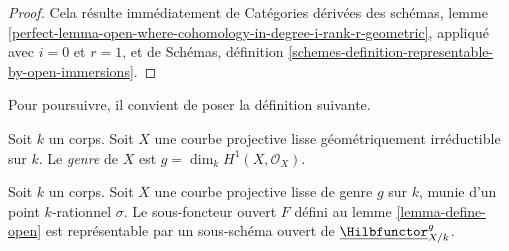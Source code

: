\begin{proof}
Cela résulte immédiatement de Catégories dérivées des schémas, lemme
\ref{perfect-lemma-open-where-cohomology-in-degree-i-rank-r-geometric},
appliqué avec $i = 0$ et $r = 1$, et de
Schémas, définition \ref{schemes-definition-representable-by-open-immersions}.
\end{proof}

\noindent
Pour poursuivre, il convient de poser la définition suivante.

\begin{definition}
\label{definition-genus}
Soit $k$ un corps. Soit $X$ une courbe projective lisse géométriquement irréductible
sur $k$. Le {\it genre} de $X$ est $g = \dim_k H^1(X, \mathcal{O}_X)$.
\end{definition}

\begin{lemma}
\label{lemma-open-representable}
Soit $k$ un corps. Soit $X$ une courbe projective lisse de genre $g$
sur $k$, munie d'un point $k$-rationnel $\sigma$. Le sous-foncteur ouvert $F$ défini
au lemme \ref{lemma-define-open} est représentable par un sous-schéma ouvert de
$\underline{\Hilbfunctor}^g_{X/k}$.
\end{lemma}

